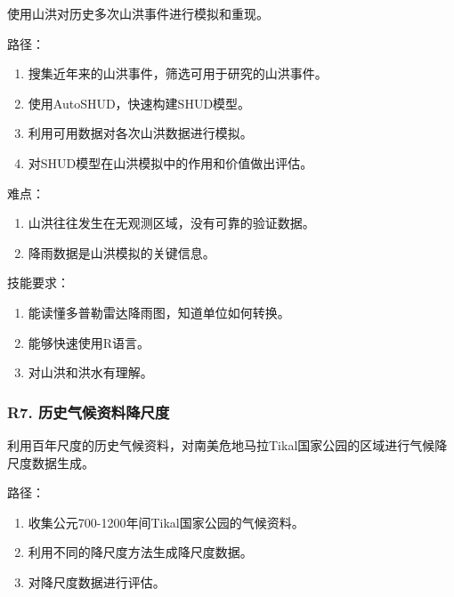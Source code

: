 \documentclass[
]{book}
\providecommand{\tightlist}{%
  \setlength{\itemsep}{0pt}\setlength{\parskip}{0pt}}
\begin{document}
使用山洪对历史多次山洪事件进行模拟和重现。

路径：

\begin{enumerate}
\def\labelenumi{\arabic{enumi}.}
\tightlist
\item
  搜集近年来的山洪事件，筛选可用于研究的山洪事件。
\item
  使用AutoSHUD，快速构建SHUD模型。
\item
  利用可用数据对各次山洪数据进行模拟。
\item
  对SHUD模型在山洪模拟中的作用和价值做出评估。
\end{enumerate}

难点：

\begin{enumerate}
\def\labelenumi{\arabic{enumi}.}
\tightlist
\item
  山洪往往发生在无观测区域，没有可靠的验证数据。
\item
  降雨数据是山洪模拟的关键信息。
\end{enumerate}

技能要求：

\begin{enumerate}
\def\labelenumi{\arabic{enumi}.}
\tightlist
\item
  能读懂多普勒雷达降雨图，知道单位如何转换。
\item
  能够快速使用R语言。
\item
  对山洪和洪水有理解。
\end{enumerate}

\hypertarget{r7.-ux5386ux53f2ux6c14ux5019ux8d44ux6599ux964dux5c3aux5ea6}{%
\subsubsection{\texorpdfstring{\textbf{R7. 历史气候资料降尺度}}{R7. 历史气候资料降尺度}}\label{r7.-ux5386ux53f2ux6c14ux5019ux8d44ux6599ux964dux5c3aux5ea6}}

利用百年尺度的历史气候资料，对南美危地马拉Tikal国家公园的区域进行气候降尺度数据生成。

路径：

\begin{enumerate}
\def\labelenumi{\arabic{enumi}.}
\tightlist
\item
  收集公元700-1200年间Tikal国家公园的气候资料。
\item
  利用不同的降尺度方法生成降尺度数据。
\item
  对降尺度数据进行评估。
\end{enumerate}
\end{document}
